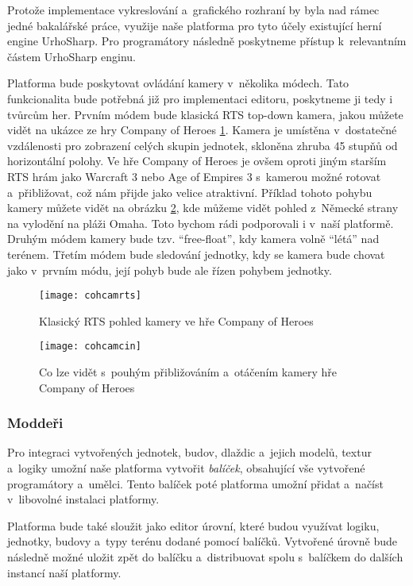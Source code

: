 Protože implementace vykreslování a~grafického rozhraní by byla nad rámec jedné bakalářské práce, využije naše platforma pro tyto účely existující herní engine UrhoSharp. Pro programátory následně  poskytneme přístup k~relevantním částem UrhoSharp enginu.

Platforma bude poskytovat ovládání kamery v~několika módech. Tato funkcionalita bude potřebná již pro implementaci editoru, poskytneme ji tedy i tvůrcům her. Prvním módem bude klasická RTS top-down kamera, jakou můžete vidět na ukázce ze hry Company of Heroes \ref{fig:cohcamrts}. Kamera je umístěna v~dostatečné vzdálenosti pro zobrazení celých skupin jednotek, skloněna zhruba 45 stupňů od horizontální polohy.  Ve hře Company of Heroes je ovšem oproti jiným starším RTS hrám jako Warcraft 3 nebo Age of Empires 3 s~kamerou možné rotovat a~přibližovat, což nám přijde jako velice atraktivní. Příklad tohoto pohybu kamery můžete vidět na obrázku \ref{fig:cohcamcin}, kde můžeme vidět pohled z~Německé strany na vylodění na pláži Omaha. Toto bychom rádi podporovali i v~naší platformě. Druhým módem kamery bude tzv. ``free-float'', kdy kamera volně ``létá'' nad terénem. Třetím módem bude sledování jednotky, kdy se kamera bude chovat jako v~prvním módu, její pohyb bude ale řízen pohybem jednotky.

\begin{figure}[h]	
	\centering
	\texttt{[image: cohcamrts]}
	\caption{Klasický RTS pohled kamery ve hře Company of Heroes}
	\label{fig:cohcamrts}
\end{figure}

\begin{figure}[h]	
	\centering
	\texttt{[image: cohcamcin]}
	\caption{Co lze vidět s~pouhým přibližováním a~otáčením kamery hře Company of Heroes}
	\label{fig:cohcamcin}
\end{figure}

\subsubsection{Moddeři}

Pro integraci vytvořených jednotek, budov, dlaždic a~jejich modelů, textur a~logiky umožní naše platforma vytvořit \emph{balíček}, obsahující vše vytvořené programátory a~umělci.  Tento balíček poté platforma umožní přidat a~načíst v~libovolné instalaci platformy.

Platforma bude také sloužit jako editor úrovní, které budou využívat logiku, jednotky, budovy a~typy terénu dodané pomocí balíčků. Vytvořené úrovně bude následně možné uložit zpět do balíčku a~distribuovat spolu s~balíčkem do dalších instancí naší platformy.

